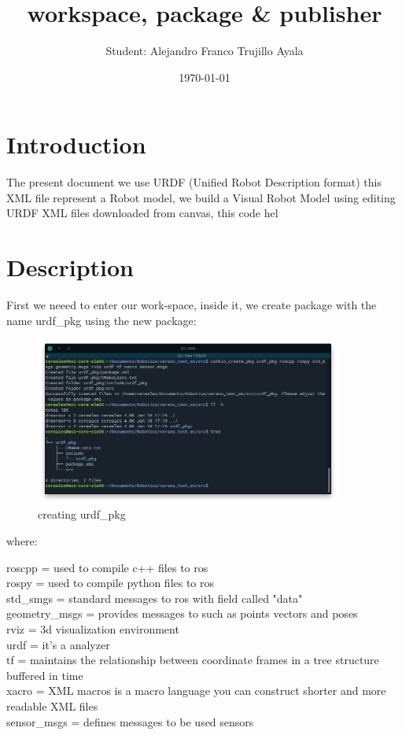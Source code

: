 \documentclass{article}
\title{workspace, package \& publisher}
\author{Student: Alejandro Franco Trujillo Ayala}
\date{\today}
\begin{document}
\maketitle


\section{Introduction}
The present document we use URDF (Unified Robot Description format) this XML file represent a Robot model, we build a Visual Robot Model using editing URDF XML files downloaded from canvas, this code hel


\section{Description}

First we neeed to enter our work-space, inside it, we create package with the name urdf\_pkg using the new package:

\begin{figure}[H]
    \centering
    \includegraphics[width=0.9\textwidth]{images/urdf_create.png}
    \caption{creating urdf\_pkg}
    \label{fig:urdf_pkg}
\end{figure}

where:

roscpp = used to compile c++ files to ros\\
rospy = used to compile python files to ros\\
std\_smgs = standard messages to ros with field called "data"\\
geometry\_msgs = provides messages to such as points vectors and poses\\
rviz = 3d visualization environment\\
urdf = it's a analyzer\\
tf = maintains the relationship between coordinate frames in a tree structure buffered in time\\
xacro = XML macros is a macro language you can construct shorter and more readable XML files\\
sensor\_msgs = defines messages to be used sensors\\
\end{document}
